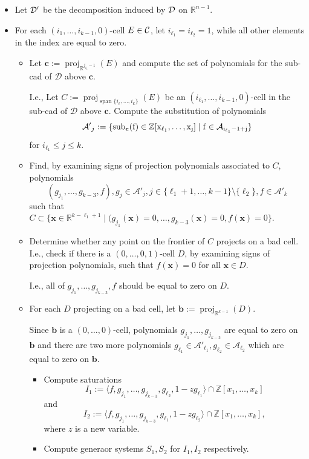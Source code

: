\documentclass[
]{book}
\theoremstyle{definition}
\theoremstyle{definition}
\theoremstyle{definition}
\theoremstyle{definition}
\theoremstyle{remark}
\begin{document}
\begin{itemize}
\item
  Let \(\cal D'\) be the decomposition induced by \(\cal D\) on \(\mathbb{R}^{n-1}\).
\item
  For each \((i_1,\ldots,i_{k-1},0)\)-cell \(E \in \cal{C}\), let \(i_{\ell_1} = i_{\ell_2} = 1\), while all other elements in the index are equal to zero.

  \begin{itemize}
  \item
    Let \(\mathbf{c} := {\operatorname{proj}_{\mathbb{R}^{j_{\ell_1} - 1}}}(E)\) and compute the set of polynomials for the sub-cad of \(\mathcal{D}\) above \(\mathbf{c}\).

    I.e., Let \(C := {\operatorname{proj}_{{\operatorname{span} \{i_\ell,\ldots,i_k\}}}}(E)\) be an \((i_{\ell_1},\ldots,i_{k-1},0)\)-cell in the sub-cad of \(\mathcal{D}\) above \(\mathbf{c}\). Compute the substitution of polynomials
    \[
    \mathcal{A'}_{j} := \{ \rm{sub}_{\mathbf{c}} (f) \in \mathbb{Z}[x_{\ell_1},\ldots,x_j] \mid f \in \mathcal{A}_{i_{\ell_1} - 1 + j} \}
    \]
    for \(i_{\ell_1} \le j \le k\).
  \item
    Find, by examining signs of projection polynomials associated to \(C\), polynomials
    \[
    (g_{j_1},\ldots,g_{k-3}, f), g_j \in \mathcal{A'}_j, j \in \{\ell_1 + 1,\ldots,k-1\} \setminus \{ \ell_2 \}, f \in \mathcal{A'}_k
    \]
    such that \(C \subset \{ \mathbf{x} \in \mathbb{R}^{k-\ell_1 + 1} \mid (g_{j_1}(\mathbf{x}) = 0,\ldots,g_{k-3}(\mathbf{x}) = 0, f(\mathbf{x}) = 0 \}\).
  \item
    Determine whether any point on the frontier of \(C\) projects on a bad cell. I.e., check if there is a \((0,\ldots,0,1)\)-cell \(D\), by examining signs of projection polynomials, such that \(f(\mathbf{x}) = 0\) for all \(\mathbf{x} \in D\).

    I.e., all of \(g_{j_1},\ldots,g_{j_{k-3}},f\) should be equal to zero on \(D\).
  \item
    For each \(D\) projecting on a bad cell, let \(\mathbf{b} := {\operatorname{proj}_{\mathbb{R}^{k-1}}}(D)\).

    Since \(\mathbf{b}\) is a \((0,\ldots,0)\)-cell, polynomials \(g_{j_1},\ldots,g_{j_{k-3}}\) are equal to zero on \(\mathbf{b}\) and there are two more polynomials \(g_{\ell_1} \in \mathcal{A'}_{\ell_1}, g_{\ell_2} \in \mathcal{A}_{\ell_2}\) which are equal to zero on \(\mathbf{b}\).

    \begin{itemize}
    \item
      Compute saturations \[
      I_1 := \langle f, g_{j_1}, \ldots, g_{j_{k-3}}, g_{\ell_2}, 1 - z g_{\ell_1} \rangle \cap \mathbb{Z}[x_1,\ldots,x_k]
      \]
      and
      \[
      I_2 := \langle f, g_{j_1}, \ldots, g_{j_{k-3}}, g_{\ell_1}, 1 - z g_{\ell_2} \rangle \cap \mathbb{Z}[x_1,\ldots,x_k],
      \]
      where \(z\) is a new variable.
    \item
      Compute generaor systems \(S_1, S_2\) for \(I_1,I_2\) respectively.
    \end{itemize}


\end{itemize}
\end{itemize}
\end{document}
